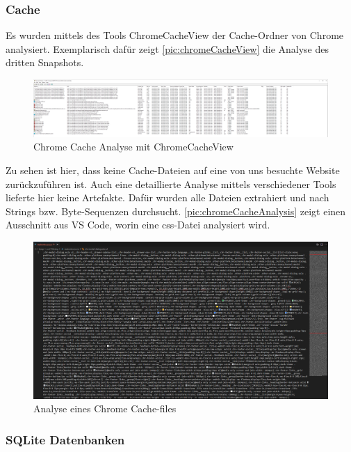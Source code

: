 \begin{appendices}
\subsubsection*{Cache}
Es wurden mittels des Tools ChromeCacheView der Cache-Ordner von Chrome analysiert. Exemplarisch dafür zeigt \autoref{pic:chromeCacheView} die Analyse des dritten Snapshots.

\begin{figure}[h!]
	\centering
	\includegraphics[width=\textwidth]{bilder/ChromeCache.png}
	\caption{Chrome Cache Analyse mit ChromeCacheView}
	\label{pic:chromeCacheView}
\end{figure}

Zu sehen ist hier, dass keine Cache-Dateien auf eine von uns besuchte Website zurückzuführen ist. Auch eine detaillierte Analyse mittels verschiedener Tools lieferte hier keine Artefakte. Dafür wurden alle Dateien extrahiert und nach Strings bzw. Byte-Sequenzen durchsucht. \autoref{pic:chromeCacheAnalysis} zeigt einen Ausschnitt aus VS Code, worin eine css-Datei analysiert wird. 

\begin{figure}[h!]
	\centering
	\includegraphics[width=\textwidth]{bilder/CacheChromeAnalyse.png}
	\caption{Analyse eines Chrome Cache-files}
	\label{pic:chromeCacheAnalysis}
\end{figure}

\subsubsection*{SQLite Datenbanken}


\end{appendices}

